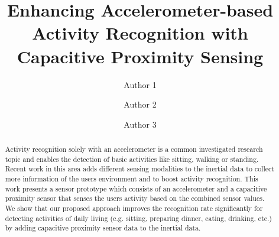 \documentclass[runningheads,a4paper]{llncs}
\begin{document}
\mainmatter  %

\title{Enhancing Accelerometer-based Activity Recognition with Capacitive Proximity Sensing}


\author{Author 1 \and Author 2 \and Author 3 }





\maketitle
\begin{abstract}
Activity recognition solely with an accelerometer is a common investigated research topic and enables the detection of basic activities like sitting, walking or standing. Recent work in this area adds different sensing modalities to the inertial data to collect more information of the users environment and to boost activity recognition. This work presents a sensor prototype which consists of an accelerometer and a capacitive proximity sensor that senses the users activity based on the combined sensor values. We show that our proposed approach improves the recognition rate significantly for detecting activities of daily living (e.g. sitting, preparing dinner, eating, drinking, etc.) by adding capacitive proximity sensor data to the inertial data.
\end{abstract}
\end{document}
